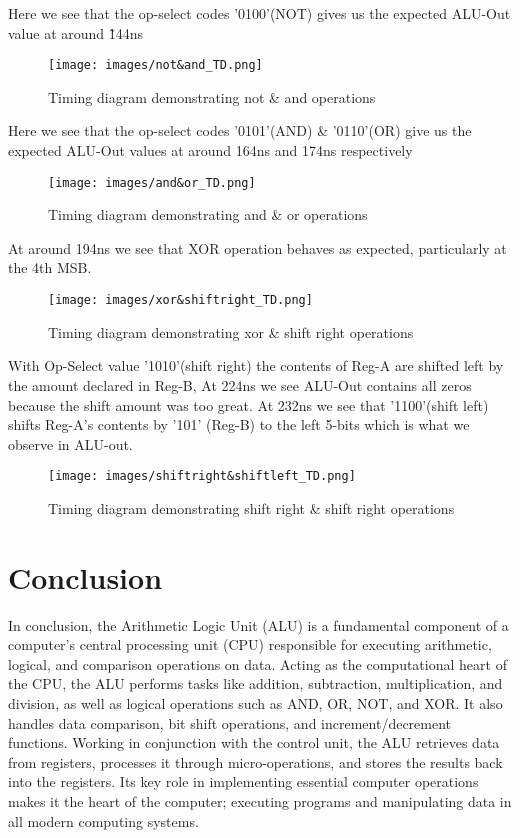 \documentclass[notitlepage,a4paper,oneside,article,table]{article}
\begin{document}
Here we see that the op-select codes '0100'(NOT) gives us the expected ALU-Out value at around \~144ns
\begin{figure}[h] %
    \centering
    \texttt{[image: images/not\&and\_TD.png]}
    \caption{Timing diagram demonstrating not \& and operations}
\end{figure}
\FloatBarrier
Here we see that the op-select codes '0101'(AND) \& '0110'(OR) give us the expected ALU-Out values at around 164ns and 174ns respectively
\begin{figure}[h] %
    \centering
    \texttt{[image: images/and\&or\_TD.png]}
    \caption{Timing diagram demonstrating and \& or operations}
\end{figure}
\FloatBarrier
At around 194ns we see that XOR operation behaves as expected, particularly at the 4th MSB.
\begin{figure}[h] %
    \centering
    \texttt{[image: images/xor\&shiftright\_TD.png]}
    \caption{Timing diagram demonstrating xor \& shift right operations}
\end{figure}
\FloatBarrier
With Op-Select value '1010'(shift right) the contents of Reg-A are shifted left by the amount declared in Reg-B, At 224ns we see ALU-Out contains all zeros because the shift amount was too great. At 232ns we see that '1100'(shift left) shifts Reg-A's contents by '101' (Reg-B) to the left 5-bits which is what we observe in ALU-out. 
\begin{figure}[h] %
    \centering
    \texttt{[image: images/shiftright\&shiftleft\_TD.png]}
    \caption{Timing diagram demonstrating shift right \& shift right operations}
\end{figure}
\FloatBarrier


\section{Conclusion} 
In conclusion, the Arithmetic Logic Unit (ALU) is a fundamental component of a computer's central processing unit (CPU) responsible for executing arithmetic, logical, and comparison operations on data. Acting as the computational heart of the CPU, the ALU performs tasks like addition, subtraction, multiplication, and division, as well as logical operations such as AND, OR, NOT, and XOR. It also handles data comparison, bit shift operations, and increment/decrement functions. Working in conjunction with the control unit, the ALU retrieves data from registers, processes it through micro-operations, and stores the results back into the registers. Its key role in implementing essential computer operations makes it the heart of the computer; executing programs and manipulating data in all modern computing systems.
\end{document}
